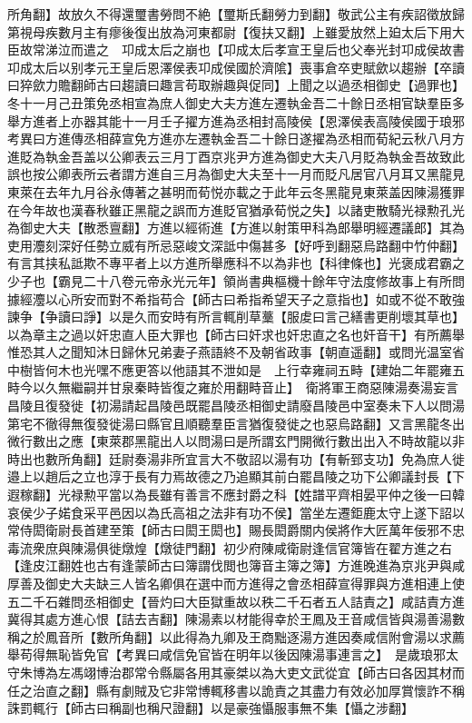 所角翻】故放久不得還璽書勞問不絶【璽斯氏翻勞力到翻】敬武公主有疾詔徵放歸第視母疾數月主有瘳後復出放為河東都尉【復扶又翻】上雖愛放然上廹太后下用大臣故常涕泣而遣之　卭成太后之崩也【卭成太后孝宣王皇后也父奉光封卭成侯故書卭成太后以别孝元王皇后恩澤侯表卭成侯國於濟隂】喪事倉卒吏賦歛以趨辦【卒讀曰猝歛力贍翻師古曰趨讀曰趣言苟取辦趣與促同】上聞之以過丞相御史【過罪也】冬十一月己丑策免丞相宣為庶人御史大夫方進左遷執金吾二十餘日丞相官缺羣臣多舉方進者上亦器其能十一月壬子擢方進為丞相封高陵侯【恩澤侯表高陵侯國于琅邪考異曰方進傳丞相薛宣免方進亦左遷執金吾二十餘日遂擢為丞相而荀紀云秋八月方進貶為執金吾盖以公卿表云三月丁酉京兆尹方進為御史大夫八月貶為執金吾故致此誤也按公卿表所云者謂方進自三月為御史大夫至十一月而貶凡居官八月耳又黑龍見東萊在去年九月谷永傳著之甚明而荀悦亦載之于此年云冬黑龍見東萊盖因陳湯獲罪在今年故也漢春秋雖正黑龍之誤而方進貶官猶承荀悦之失】以諸吏散騎光禄勲孔光為御史大夫【散悉亶翻】方進以經術進【方進以射策甲科為郎舉明經遷議郎】其為吏用灋刻深好任勢立威有所忌惡峻文深詆中傷甚多【好呼到翻惡烏路翻中竹仲翻】有言其挟私詆欺不專平者上以方進所舉應科不以為非也【科律條也】光褒成君霸之少子也【霸見二十八卷元帝永光元年】領尚書典樞機十餘年守法度修故事上有所問據經灋以心所安而對不希指苟合【師古曰希指希望天子之意指也】如或不從不敢強諫争【争讀曰諍】以是久而安時有所言輒削草藳【服䖍曰言己繕書更削壞其草也】以為章主之過以奸忠直人臣大罪也【師古曰奸求也奸忠直之名也奸音干】有所薦舉惟恐其人之聞知沐日歸休兄弟妻子燕語終不及朝省政事【朝直遥翻】或問光温室省中樹皆何木也光嘿不應更答以他語其不泄如是　上行幸雍祠五畤【建始二年罷雍五畤今以久無繼嗣并甘泉秦畤皆復之雍於用翻畤音止】　衛將軍王商惡陳湯奏湯妄言昌陵且復發徙【初湯請起昌陵邑既罷昌陵丞相御史請廢昌陵邑中室奏未下人以問湯第宅不徹得無復發徙湯曰縣官且順聽羣臣言猶復發徙之也惡烏路翻】又言黑龍冬出微行數出之應【東萊郡黑龍出人以問湯曰是所謂玄門開微行數出出入不時故龍以非時出也數所角翻】廷尉奏湯非所宜言大不敬詔以湯有功【有斬郅支功】免為庶人徙邉上以趙后之立也淳于長有力焉故德之乃追顯其前白罷昌陵之功下公卿議封長【下遐稼翻】光禄勲平當以為長雖有善言不應封爵之科【姓譜平齊相晏平仲之後一曰韓哀侯少子婼食采平邑因以為氏高祖之法非有功不侯】當坐左遷鉅鹿太守上遂下詔以常侍閎衛尉長首建至策【師古曰閎王閎也】賜長閎爵關内侯將作大匠萬年佞邪不忠毒流衆庶與陳湯俱徙燉煌【燉徒門翻】初少府陳咸衛尉逢信官簿皆在翟方進之右【逢皮江翻姓也古有逢蒙師古曰簿謂伐閲也簿音主簿之簿】方進晚進為京兆尹與咸厚善及御史大夫缺三人皆名卿俱在選中而方進得之會丞相薛宣得罪與方進相連上使五二千石雜問丞相御史【晉灼曰大臣獄重故以秩二千石者五人詰責之】咸詰責方進冀得其處方進心恨【詰去吉翻】陳湯素以材能得幸於王鳳及王音咸信皆與湯善湯數稱之於鳳音所【數所角翻】以此得為九卿及王商黜逐湯方進因奏咸信附會湯以求薦舉苟得無恥皆免官【考異曰咸信免官皆在明年以後因陳湯事連言之】　是歲琅邪太守朱博為左馮翊博治郡常令縣屬各用其豪桀以為大吏文武從宜【師古曰各因其材而任之治直之翻】縣有劇賊及它非常博輒移書以詭責之其盡力有效必加厚賞懷詐不稱誅罰輒行【師古曰稱副也稱尺證翻】以是豪強懾服事無不集【懾之涉翻】

